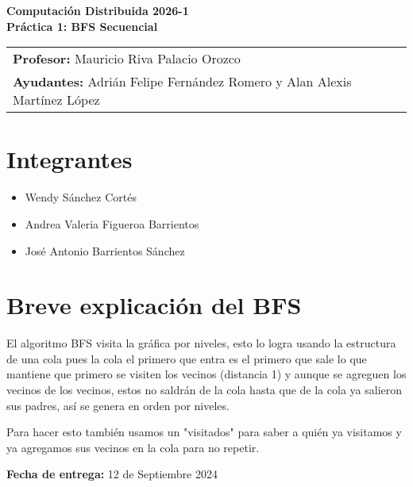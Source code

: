 \documentclass[12pt, a4paper]{article}
\begin{document}
\begin{center}
    \textbf{\Large Computación Distribuida 2026-1} \\
    \vspace{0.75cm} %
    \textbf{\Large Práctica 1: BFS Secuencial} \\
    \vspace{1.5cm} %

    \begin{tabular}{l}
        \textbf{Profesor:} Mauricio Riva Palacio Orozco \\
        \textbf{Ayudantes:} Adrián Felipe Fernández Romero y Alan Alexis Martínez López \\
    \end{tabular}
\end{center}

\vspace{1cm} %


\section*{Integrantes}
\begin{itemize}
    \item Wendy Sánchez Cortés
    \item Andrea Valeria Figueroa Barrientos
    \item José Antonio Barrientos Sánchez
\end{itemize}


\section*{Breve explicación del BFS}

El algoritmo BFS visita la gráfica por niveles, esto lo logra usando la estructura de una cola pues la cola el primero que entra es el primero que sale lo que mantiene que primero se visiten los vecinos (distancia 1) y aunque se agreguen los vecinos de los vecinos, estos no saldrán de la cola hasta que de la cola ya salieron sus padres, así se genera en orden por niveles.

Para hacer esto también usamos un "visitados" para saber a quién ya visitamos y ya agregamos sus vecinos en la cola para no repetir.

\vfill %

\begin{flushright} %
    \textbf{Fecha de entrega:} 12 de Septiembre 2024
\end{flushright}
\end{document}
